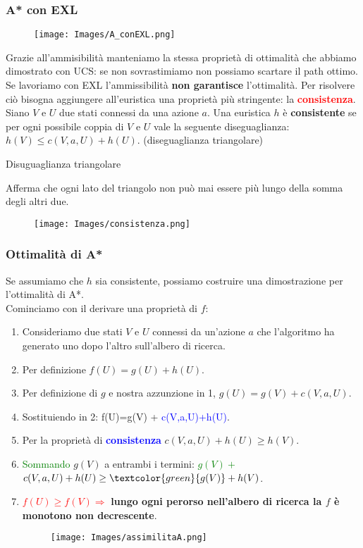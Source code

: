 \documentclass{article}
\begin{document}
\subsubsection{A* con EXL}
\begin{figure}[H]
    \centering
    \texttt{[image: Images/A\_conEXL.png]}
\end{figure}
Grazie all'ammisibilità manteniamo la stessa proprietà di ottimalità che abbiamo dimostrato con UCS: se non sovrastimiamo non possiamo scartare il path ottimo. \\
Se lavoriamo con EXL l'ammissibilità \textbf{non garantisce} l'ottimalità. Per risolvere ciò bisogna aggiungere all'euristica una proprietà più stringente: la \textcolor{red}{\textbf{consistenza}}.
\\ Siano $V$ e $U$ due stati connessi da una azione $a$. Una euristica $h$ è \textbf{consistente} se per ogni possibile coppia di $V$ e $U$ vale la seguente diseguaglianza: $h(V) \leq c(V, a, U)+h(U)$. (diseguaglianza triangolare)
\\
\begin{frame}{Disuguaglianza triangolare}
\end{frame}
Afferma che ogni lato del triangolo non può mai essere più lungo della somma degli altri due. 
\begin{figure}[H]
    \centering
    \texttt{[image: Images/consistenza.png]}
\end{figure}
\subsubsection{Ottimalità di A*}
Se assumiamo che $h$ sia consistente, possiamo costruire una dimostrazione per l'ottimalità di A*. \\ Cominciamo con il derivare una proprietà di $f$:
\begin{enumerate}
    \item Consideriamo due stati $V$ e $U$ connessi da un'azione $a$ che l'algoritmo ha generato uno dopo l'altro sull'albero di ricerca.
    \item Per definizione $f(U)=g(U)+h(U)$.
    \item Per definizione di $g$ e nostra azzunzione in 1, $g(U)=g(V) + c(V,a,U)$.
    \item Sostituiendo in 2: f(U)=g(V) + \textcolor{blue}{c(V,a,U)+h(U)}.
    \item Per la proprietà di \textcolor{blue}{\textbf{consistenza}} $c(V,a,U)+h(U) \geq h(V)$.
    \item \textcolor{green}{Sommando} $g(V)$ a entrambi i termini: \textcolor{green}{$g(V)+$} $c(V,a,U)+h(U) \geq \textcolor{green}{g(V)}+ h(V)$.
    \item \textcolor{red}{\textbf{$f(U) \geq f(V) \Rightarrow$}} \textbf{lungo ogni perorso nell'albero di ricerca la $f$ è monotono non decrescente}.
    \begin{figure}[H]
        \centering
        \texttt{[image: Images/assimilitaA.png]}
    \end{figure}
\end{enumerate}
\end{document}
